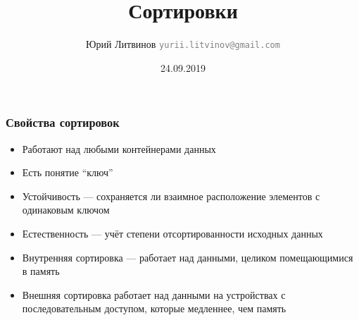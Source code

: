 \documentclass[xetex,mathserif,serif]{beamer}
\title{Сортировки}
\author[Юрий Литвинов]{Юрий Литвинов \newline \textcolor{gray}{\small\texttt{yurii.litvinov@gmail.com}}}
\date{24.09.2019}
\begin{document}
	
	\frame{\titlepage}
	
	\begin{frame}
		\frametitle{Свойства сортировок}
		\begin{itemize}
			\item Работают над любыми контейнерами данных
			\item Есть понятие ``ключ''
			\item Устойчивость --- сохраняется ли взаимное расположение элементов с одинаковым ключом
			\item Естественность --- учёт степени отсортированности исходных данных
			\item Внутренняя сортировка --- работает над данными, целиком помещающимися в память
			\item Внешняя сортировка работает над данными на устройствах с последовательным доступом, которые медленнее, чем память
		\end{itemize}
	\end{frame}
\end{document}
